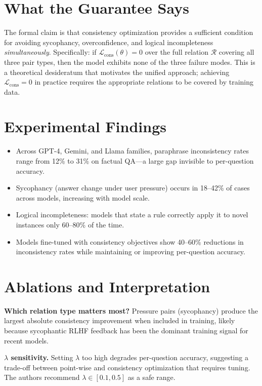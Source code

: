\documentclass[10pt,twocolumn]{article}
\begin{document}
\section{What the Guarantee Says}

The formal claim is that consistency optimization provides a sufficient condition for
avoiding sycophancy, overconfidence, and logical incompleteness \emph{simultaneously}.
Specifically: if $\mathcal{L}_{\mathrm{cons}}(\theta) = 0$ over the full relation
$\mathcal{R}$ covering all three pair types, then the model exhibits none of the three
failure modes. This is a theoretical desideratum that motivates the unified approach;
achieving $\mathcal{L}_{\mathrm{cons}} = 0$ in practice requires the appropriate
relations to be covered by training data.

\section{Experimental Findings}

\begin{itemize}[itemsep=2pt,parsep=0pt]
  \item Across GPT-4, Gemini, and Llama families, paraphrase inconsistency rates
    range from 12\% to 31\% on factual QA---a large gap invisible to per-question accuracy.
  \item Sycophancy (answer change under user pressure) occurs in 18--42\% of cases
    across models, increasing with model scale.
  \item Logical incompleteness: models that state a rule correctly apply it to novel
    instances only 60--80\% of the time.
  \item Models fine-tuned with consistency objectives show 40--60\% reductions in
    inconsistency rates while maintaining or improving per-question accuracy.
\end{itemize}

\section{Ablations and Interpretation}

\textbf{Which relation type matters most?} Pressure pairs (sycophancy) produce the
largest absolute consistency improvement when included in training, likely because
sycophantic RLHF feedback has been the dominant training signal for recent models.

\textbf{$\lambda$ sensitivity.} Setting $\lambda$ too high degrades per-question
accuracy, suggesting a trade-off between point-wise and consistency optimization that
requires tuning. The authors recommend $\lambda \in [0.1, 0.5]$ as a safe range.
\end{document}
